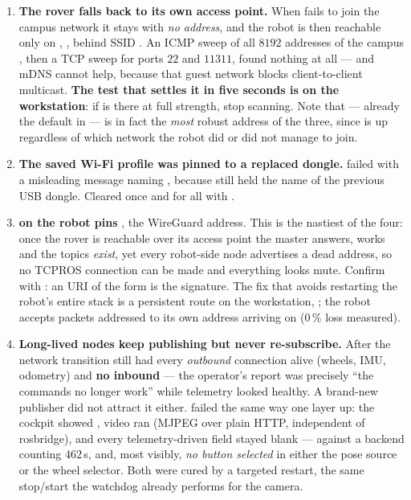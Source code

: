 \begin{enumerate}[leftmargin=1.4em]
\item \textbf{The rover falls back to its own access point.} When
   fails to join the campus network it stays  with
  \emph{no address}, and the robot is then reachable only on ,
  , behind SSID . An ICMP sweep of all
  $8192$ addresses of the campus , then a TCP sweep for ports $22$
  and $11311$, found nothing at all --- and mDNS cannot help, because that
  guest network blocks client-to-client multicast. \textbf{The test that
  settles it in five seconds is  on the
  workstation}: if  is there at full strength, stop
  scanning. Note that  --- already the default in
   --- is in fact the \emph{most} robust address of
  the three, since  is up regardless of which network the robot did
  or did not manage to join.
\item \textbf{The saved Wi-Fi profile was pinned to a replaced dongle.}
   failed with a misleading message
  naming , because  still held the
  name of the previous USB dongle. Cleared once and for all with
  .
\item \textbf{ on the robot pins
  }, the WireGuard address. This is the nastiest
  of the four: once the rover is reachable over its access point the master
  answers,  works and the topics \emph{exist}, yet every
  robot-side node advertises a dead address, so no TCPROS connection can be
  made and everything looks mute. Confirm with : an URI of
  the form  is the signature. The fix that avoids
  restarting the robot's entire stack is a persistent route on the
  workstation,
  ;
  the robot accepts packets addressed to its own  address arriving
  on  ($0\,\%$ loss measured).
\item \textbf{Long-lived nodes keep publishing but never re-subscribe.}
  After the network transition  still had every
  \emph{outbound} connection alive (wheels, IMU, odometry) and \textbf{no
  inbound } --- the operator's report was precisely ``the
  commands no longer work'' while telemetry looked healthy. A brand-new
  publisher did not attract it either.  failed the
  same way one layer up: the cockpit showed , video ran (MJPEG
  over plain HTTP, independent of rosbridge), and every telemetry-driven
  field stayed blank ---  against a backend counting
  $462$\,s, and, most visibly, \emph{no button selected} in either the pose
  source or the wheel selector. Both were cured by a targeted restart, the
  same  stop/start the watchdog already performs for the camera.
\end{enumerate}

